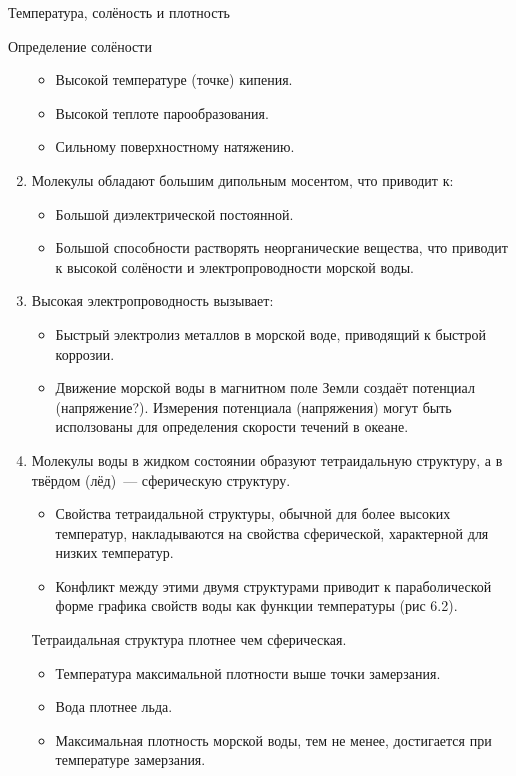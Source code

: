 \begin{chapter}{Температура, солёность и плотность}
\begin{section}{Определение солёности}
\begin{enumerate}
\begin{itemize}
  \item Высокой температуре (точке) кипения.

  \item Высокой теплоте парообразования.

  \item Сильному поверхностному натяжению. 
  \end{itemize}

\item
Молекулы обладают большим дипольным мосентом, что приводит к:
  \begin{itemize}
  \item Большой диэлектрической постоянной. 

  \item Большой способности растворять неорганические вещества, что
  приводит к высокой солёности и электропроводности морской воды.
  \end{itemize}

\item
Высокая электропроводность вызывает:
  \begin{itemize}
  \item Быстрый электролиз металлов в морской воде, приводящий к
  быстрой коррозии.

  \item Движение морской воды в магнитном поле Земли создаёт потенциал
  (напряжение?). Измерения потенциала (напряжения) могут быть
  исползованы для определения скорости течений в океане.
  \end{itemize}

\item
Молекулы воды в жидком состоянии образуют тетраидальную структуру, а в
твёрдом (лёд)~--- сферическую структуру.
  \begin{itemize}
  \item Свойства тетраидальной структуры, обычной для более высоких
  температур, накладываются на свойства сферической, характерной для
  низких температур.
        
  \item Конфликт между этими двумя структурами приводит к
  параболической форме графика свойств воды как функции температуры
  (рис 6.2).
  \end{itemize}

Тетраидальная структура плотнее чем сферическая.
  \begin{itemize}
  \item Температура максимальной плотности выше точки замерзания.
  \item Вода плотнее льда.
  \item Максимальная плотность морской воды, тем не менее, достигается
  при температуре замерзания.
  \end{itemize}
\end{enumerate}
\end{section}


\end{chapter}
